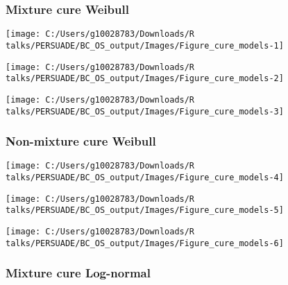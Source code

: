\documentclass[
]{article}
\begin{document}
\clearpage

\clearpage

\subsubsection{Mixture cure Weibull}\label{mixture-cure-weibull}

\begin{flushleft}\texttt{[image: C:/Users/g10028783/Downloads/R talks/PERSUADE/BC\_OS\_output/Images/Figure\_cure\_models-1]} \end{flushleft}

\begin{flushleft}\texttt{[image: C:/Users/g10028783/Downloads/R talks/PERSUADE/BC\_OS\_output/Images/Figure\_cure\_models-2]} \end{flushleft}

\begin{flushleft}\texttt{[image: C:/Users/g10028783/Downloads/R talks/PERSUADE/BC\_OS\_output/Images/Figure\_cure\_models-3]} \end{flushleft}

\clearpage

\subsubsection{Non-mixture cure Weibull}\label{non-mixture-cure-weibull}

\begin{flushleft}\texttt{[image: C:/Users/g10028783/Downloads/R talks/PERSUADE/BC\_OS\_output/Images/Figure\_cure\_models-4]} \end{flushleft}

\begin{flushleft}\texttt{[image: C:/Users/g10028783/Downloads/R talks/PERSUADE/BC\_OS\_output/Images/Figure\_cure\_models-5]} \end{flushleft}

\begin{flushleft}\texttt{[image: C:/Users/g10028783/Downloads/R talks/PERSUADE/BC\_OS\_output/Images/Figure\_cure\_models-6]} \end{flushleft}

\clearpage

\subsubsection{Mixture cure Log-normal}\label{mixture-cure-log-normal}
\end{document}

